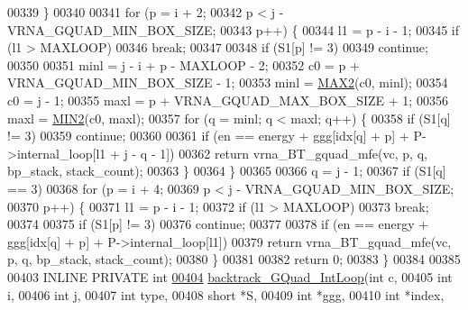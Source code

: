 \begin{DoxyCode}
00339   \}
00340 
00341   \textcolor{keywordflow}{for} (p = i + 2;
00342        p < j - VRNA\_GQUAD\_MIN\_BOX\_SIZE;
00343        p++) \{
00344     l1 = p - i - 1;
00345     \textcolor{keywordflow}{if} (l1 > MAXLOOP)
00346       \textcolor{keywordflow}{break};
00347 
00348     \textcolor{keywordflow}{if} (S1[p] != 3)
00349       \textcolor{keywordflow}{continue};
00350 
00351     minl  = j - i + p - MAXLOOP - 2;
00352     c0    = p + VRNA\_GQUAD\_MIN\_BOX\_SIZE - 1;
00353     minl  = \hyperlink{group__utils_ga33297b3679c713b0c4d897cd0fe3b122}{MAX2}(c0, minl);
00354     c0    = j - 1;
00355     maxl  = p + VRNA\_GQUAD\_MAX\_BOX\_SIZE + 1;
00356     maxl  = \hyperlink{group__utils_gae0b9cd0ce090bd69b951aa73e8fa4f7d}{MIN2}(c0, maxl);
00357     \textcolor{keywordflow}{for} (q = minl; q < maxl; q++) \{
00358       \textcolor{keywordflow}{if} (S1[q] != 3)
00359         \textcolor{keywordflow}{continue};
00360 
00361       \textcolor{keywordflow}{if} (en == energy + ggg[idx[q] + p] + P->internal\_loop[l1 + j - q - 1])
00362         \textcolor{keywordflow}{return} vrna\_BT\_gquad\_mfe(vc, p, q, bp\_stack, stack\_count);
00363     \}
00364   \}
00365 
00366   q = j - 1;
00367   \textcolor{keywordflow}{if} (S1[q] == 3)
00368     \textcolor{keywordflow}{for} (p = i + 4;
00369          p < j - VRNA\_GQUAD\_MIN\_BOX\_SIZE;
00370          p++) \{
00371       l1 = p - i - 1;
00372       \textcolor{keywordflow}{if} (l1 > MAXLOOP)
00373         \textcolor{keywordflow}{break};
00374 
00375       \textcolor{keywordflow}{if} (S1[p] != 3)
00376         \textcolor{keywordflow}{continue};
00377 
00378       \textcolor{keywordflow}{if} (en == energy + ggg[idx[q] + p] + P->internal\_loop[l1])
00379         \textcolor{keywordflow}{return} vrna\_BT\_gquad\_mfe(vc, p, q, bp\_stack, stack\_count);
00380     \}
00381 
00382   \textcolor{keywordflow}{return} 0;
00383 \}
00384 
00385 
00403 INLINE PRIVATE \textcolor{keywordtype}{int}
\hyperlink{group__gquads_ga220c41e8dbcee940ac975b8ce88e55c5}{00404} \hyperlink{group__gquads_ga220c41e8dbcee940ac975b8ce88e55c5}{backtrack\_GQuad\_IntLoop}(\textcolor{keywordtype}{int}           c,
00405                         \textcolor{keywordtype}{int}           i,
00406                         \textcolor{keywordtype}{int}           j,
00407                         \textcolor{keywordtype}{int}           type,
00408                         \textcolor{keywordtype}{short}         *S,
00409                         \textcolor{keywordtype}{int}           *ggg,
00410                         \textcolor{keywordtype}{int}           *index,

\end{DoxyCode}
